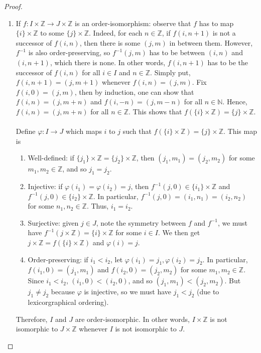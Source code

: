 \documentclass{treatise}
\begin{document}
\begin{proof}
\begin{enumerate}
    \item If $f: I \times \mathbb{Z} \to J \times \mathbb{Z}$ is an order-isomorphism: observe that $f$ has to map $\{ i \} \times \mathbb{Z}$ to some $\{ j \} \times \mathbb{Z}$. Indeed, for each $n \in \mathbb{Z}$, if $f(i, n + 1)$ is not a successor of $f(i, n)$, then there is some $(j, m)$ in between them. However, $f^{-1}$ is also order-preserving, so $f^{-1}(j, m)$ has to be between $(i, n)$ and $(i, n+1)$, which there is none. In other words, $f(i, n+1)$ has to be the successor of $f(i, n)$ for all $i \in I$ and $n \in \mathbb{Z}$. Simply put, $f(i, n+1) = (j, m+1)$ whenever $f(i, n) = (j, m)$. Fix $f(i, 0) = (j, m)$, then by induction, one can show that $f(i, n) = (j, m + n)$ and $f(i, -n) = (j, m - n)$ for all $n \in \mathbb{N}$. Hence, $f(i, n) = (j, m + n)$ for all $n \in \mathbb{Z}$. This shows that $f(\{ i \} \times \mathbb{Z}) = \{ j \} \times \mathbb{Z}$.
    \\
    \\
    Define $\varphi: I \to J$ which maps $i$ to $j$ such that $f(\{ i \} \times \mathbb{Z}) = \{ j \} \times \mathbb{Z}$. This map is
    \begin{enumerate}
        \item Well-defined: if $\{ j_1 \} \times \mathbb{Z} = \{ j_2 \} \times \mathbb{Z}$, then $(j_1, m_1) = (j_2, m_2)$ for some $m_1, m_2 \in \mathbb{Z}$, and so $j_1 = j_2$.
        \item Injective: if $\varphi(i_1) = \varphi(i_2) = j$, then $f^{-1}(j, 0) \in \{ i_1 \} \times \mathbb{Z}$ and $f^{-1}(j, 0) \in \{ i_2 \} \times \mathbb{Z}$. In particular, $f^{-1}(j, 0) = (i_1, n_1) = (i_2, n_2)$ for some $n_1, n_2 \in \mathbb{Z}$. Thus, $i_1 = i_2$.
        \item Surjective: given $j \in J$, note the symmetry between $f$ and $f^{-1}$, we must have $f^{-1}(j \times \mathbb{Z}) = \{ i \} \times \mathbb{Z}$ for some $i \in I$. We then get $j \times \mathbb{Z} = f(\{ i \} \times \mathbb{Z})$ and $\varphi(i) = j$.
        \item Order-preserving: if $i_1 < i_2$, let $\varphi(i_1) = j_1, \varphi(i_2) = j_2$. In particular, $f(i_1, 0) = (j_1, m_1)$ and $f(i_2, 0) = (j_2, m_2)$ for some $m_1, m_2 \in \mathbb{Z}$. Since $i_1 < i_2$, $(i_1, 0) < (i_2, 0)$, and so $(j_1, m_1) < (j_2, m_2)$. But $j_1 \neq j_2$ because $\varphi$ is injective, so we must have $j_1 < j_2$ (due to lexicorgraphical ordering).
    \end{enumerate}
    Therefore, $I$ and $J$ are order-isomorphic. In other words, $I \times \mathbb{Z}$ is not isomorphic to $J \times \mathbb{Z}$ whenever $I$ is not isomorphic to $J$.

\end{enumerate}
\end{proof}
\end{document}
